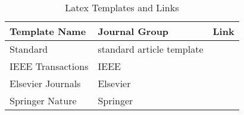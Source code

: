 \begin{table}[]
\caption{Latex Templates and Links}
\label{table-templates}
\begin{tabular}{@{}lll@{}}
\toprule
Template Name     & Journal Group             & Link \\ \midrule
Standard          & standard article template &      \\
IEEE Transactions & IEEE                      &      \\
Elsevier Journals & Elsevier                  &      \\
Springer Nature   & Springer                  &      \\ \bottomrule
\end{tabular}
\end{table}